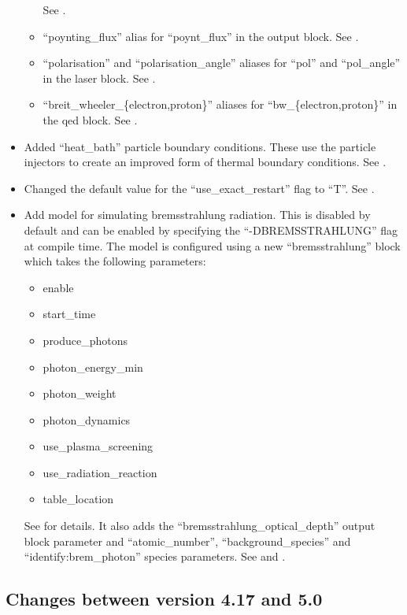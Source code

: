 \begin{itemize}
\begin{itemize}
    See .
\item ``poynting\_flux'' alias for ``poynt\_flux'' in the output block.
    See .
\item ``polarisation'' and ``polarisation\_angle'' aliases for ``pol'' and
    ``pol\_angle'' in the laser block.  See .
\item ``breit\_wheeler\_\{electron,proton\}'' aliases for
    ``bw\_\{electron,proton\}'' in the qed block. See .
\end{itemize}
\item Added ``heat\_bath'' particle boundary conditions. These use the particle
    injectors to create an improved form of thermal boundary conditions.
    See .
\item Changed the default value for the ``use\_exact\_restart'' flag to ``T''.
    See .
\item Add model for simulating bremsstrahlung radiation. This is disabled by
    default and can be enabled by specifying the ``-DBREMSSTRAHLUNG'' flag at
    compile time. The model is configured using a new ``bremsstrahlung'' block
    which takes the following parameters:
\begin{itemize}
\item enable
\item start\_time
\item produce\_photons
\item photon\_energy\_min
\item photon\_weight
\item photon\_dynamics
\item use\_plasma\_screening
\item use\_radiation\_reaction
\item table\_location
\end{itemize}
    See  for details.
    It also adds the ``bremsstrahlung\_optical\_depth'' output block parameter
    and ``atomic\_number'', ``background\_species'' and
    ``identify:brem\_photon'' species parameters. See
     and .
\end{itemize}
\bigskip


\subsection{Changes between version 4.17 and 5.0}

